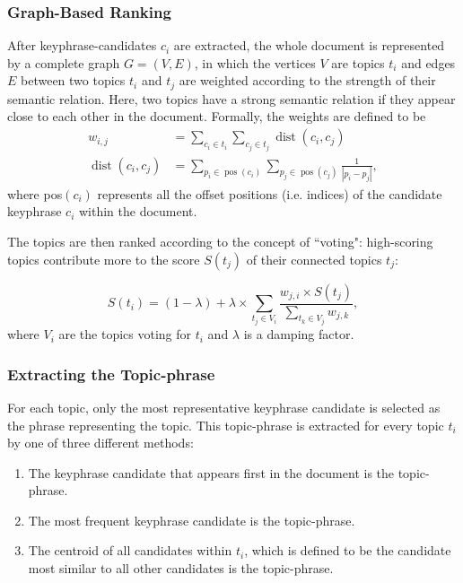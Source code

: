         \subsubsection{Graph-Based Ranking}
        After keyphrase-candidates $c_i$ are extracted, the whole document is represented by a complete graph $G = (V, E)$, in which the vertices $V$ are topics $t_i$ and edges $E$ between two topics $t_i$ and $t_j$ are weighted according to the strength of their semantic relation. Here, two topics have a strong semantic relation if they appear close to each other in the document. Formally, the weights are defined to be
            \begin{align}
                w_{i, j} &=\sum_{c_{i} \in t_{i}} \sum_{c_{j} \in t_{j}} \operatorname{dist}\left(c_{i}, c_{j}\right) \\
                \operatorname{dist}\left(c_{i}, c_{j}\right) &=\sum_{p_{i} \in \operatorname{pos}\left(c_{i}\right)} \sum_{p_{j} \in \operatorname{pos}\left(c_{j}\right)} \frac{1}{\left|p_{i}-p_{j}\right|},
            \end{align}
        where pos$(c_i)$ represents all the offset positions (i.e. indices) of the candidate keyphrase $c_i$ within the document.
        
        The topics are then ranked according to the concept of ``voting": high-scoring topics contribute more to the score $S(t_j)$ of their connected topics $t_j$:
        
        \begin{equation}
            S\left(t_{i}\right)=(1-\lambda)+\lambda \times \sum_{t_{j} \in V_{i}} \frac{w_{j, i} \times S\left(t_{j}\right)}{\sum_{t_{k} \in V_{j}} w_{j, k}},
        \end{equation}
        where $V_i$ are the topics voting for $t_i$ and $\lambda$ is a damping factor.
        
        \subsubsection{Extracting the Topic-phrase}
        For each topic, only the most representative keyphrase candidate is selected as the phrase representing the topic. This topic-phrase is extracted for every topic $t_i$ by one of three different methods:
        \begin{enumerate}
            \item The keyphrase candidate that appears first in the document is the topic-phrase.
            \item The most frequent keyphrase candidate is the topic-phrase.
            \item The centroid of all candidates within $t_i$, which is defined to be the candidate most similar to all other candidates is the topic-phrase.\cite{bougouin-etal-2013-topicrank}
        \end{enumerate}
    
